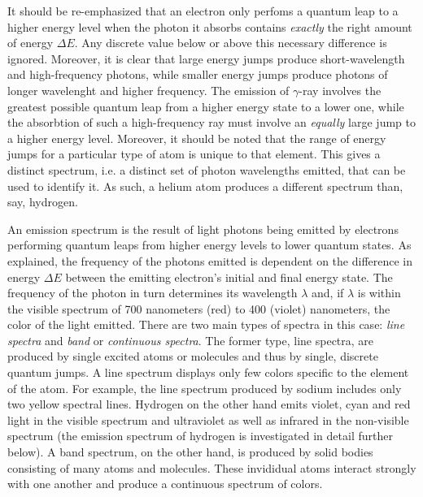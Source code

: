 It should be re-emphasized that an electron only perfoms a quantum leap to a higher energy level when the photon it absorbs contains \emph{exactly} the right amount of energy $\Delta E$. Any discrete value below or above this necessary difference is ignored. Moreover, it is clear that large energy jumps produce short-wavelength and high-frequency photons, while smaller energy jumps produce photons of longer wavelenght and higher frequency. The emission of $\gamma$-ray involves the greatest possible quantum leap from a higher energy state to a lower one, while the absorbtion of such a high-frequency ray must involve an \emph{equally} large jump to a higher energy level. Moreover, it should be noted that the range of energy jumps for a particular type of atom is unique to that element. This gives a distinct spectrum, i.e. a distinct set of photon wavelengths emitted, that can be used to identify it. As such, a helium atom produces a different spectrum than, say, hydrogen. 


An emission spectrum is the result of light photons being emitted by electrons performing quantum leaps from higher energy levels to lower quantum states. As explained, the frequency of the photons emitted is dependent on the difference in energy $\Delta E$ between the emitting electron's initial and final energy state. The frequency of the photon in turn determines its wavelength $\lambda$ and, if $\lambda$ is within the visible spectrum of 700 nanometers (red) to 400 (violet) nanometers, the color of the light emitted. There are two main types of spectra in this case: \emph{line spectra} and \emph{band} or \emph{continuous spectra}. The former type, line spectra, are produced by single excited atoms or molecules and thus by single, discrete quantum jumps. A line spectrum displays only few colors specific to the element of the atom. For example, the line spectrum produced by sodium includes only two yellow spectral lines. Hydrogen on the other hand emits violet, cyan and red light in the visible spectrum and ultraviolet as well as infrared in the non-visible spectrum (the emission spectrum of hydrogen is investigated in detail further below). A band spectrum, on the other hand, is produced by solid bodies consisting of many atoms and molecules. These invididual atoms interact strongly with one another and produce a continuous spectrum of colors.


